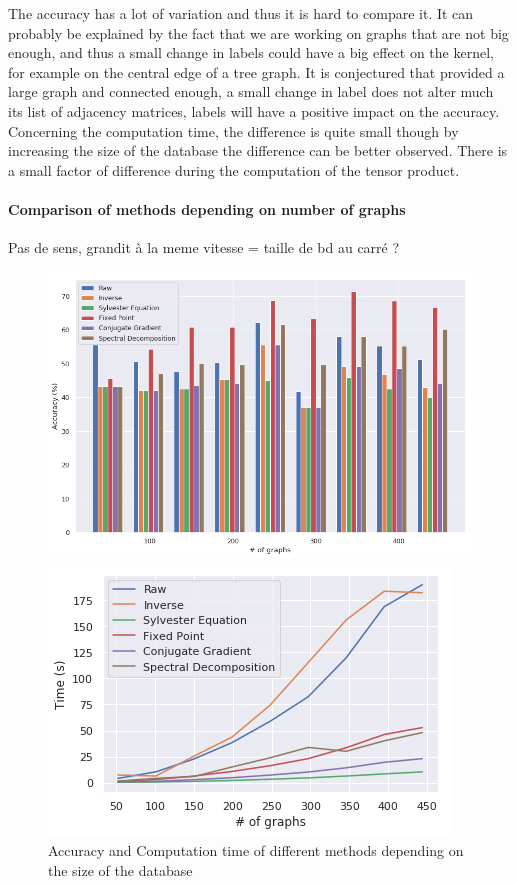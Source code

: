 \documentclass{article}
\theoremstyle{definition}
\begin{document}
The accuracy has a lot of variation and thus it is hard to compare it. It can probably be explained by the fact that we are working on graphs that are not big enough, and thus a small change in labels could have a big effect on the kernel, for example on the central edge of a tree graph. It is conjectured that provided a large graph and connected enough, a small change in label does not alter much its list of adjacency matrices, labels will have a positive impact on the accuracy. Concerning the computation time, the difference is quite small though by increasing the size of the database the difference can be better observed. There is a small factor of difference during the computation of the tensor product.
\paragraph{Comparison of methods depending on number of graphs}
Pas de sens, grandit à la meme vitesse = taille de bd au carré ?
\begin{figure}[!htb]
	\begin{multicols}{2}
		\includegraphics[width=\linewidth]{data/nb_graph/acc.png}\par
		\includegraphics[width=\linewidth]{data/nb_graph/time.png}\par
	\end{multicols}
	\caption{Accuracy and Computation time of different methods depending on the size of the database}
\end{figure}
\end{document}
